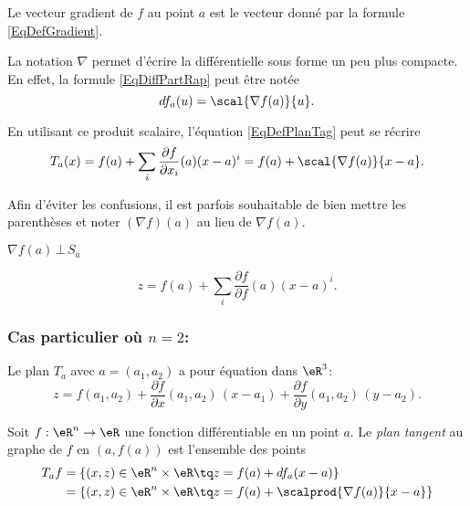 \begin{definition}
	Le vecteur gradient de $f$ au point $a$ est le vecteur donné par la formule \eqref{EqDefGradient}.
\end{definition}
La notation $\nabla$ permet d'écrire la différentielle sous forme un peu plus compacte. En effet, la formule \eqref{EqDiffPartRap} peut être notée
\begin{equation}
	df_a(u)=\scal{\nabla f(a)}{u}.
\end{equation}

En utilisant ce produit scalaire, l'équation \eqref{EqDefPlanTag} peut se récrire
\begin{equation}
	T_a(x)=f(a)+\sum_i\frac{ \partial f }{ \partial x_i }(a)(x-a)^i=f(a)+\scal{\nabla f(a)}{x-a}.
\end{equation}

Afin d'éviter les confusions, il est parfois souhaitable de bien mettre les parenthèses et noter $(\nabla f)(a)$ au lieu de $\nabla f(a)$.

\begin{proposition}
	$\nabla f(a)\,\bot \,S_a$
\end{proposition}


\begin{equation}        \label{EqPlanTgSansNabla}
	z=f(a)+\sum_i\frac{ \partial f }{ \partial f }(a)(x-a)^i.
\end{equation}

\subsubsection*{Cas particulier où $n=2$:}
Le plan $T_a$ avec $a=(a_1,a_2)$ a pour équation dans $\eR^3$:
\begin{equation}        \label{EqPlanTgEnDimDeux}
	z = f(a_1,a_2) + \frac{\partial f}{\partial x}(a_1,a_2)\,(x-a_1)+ \frac{\partial f}{\partial y}(a_1,a_2)\,(y-a_2).
\end{equation}

\begin{definition}
	Soit $f : \eR^n \to\eR$ une fonction différentiable en un point
	$a$. Le \emph{plan tangent} au graphe de $f$ en $(a,f(a))$ est
	l'ensemble des points
	\begin{equation*}
		\begin{split}
			T_af &= \{ (x,z) \in \eR^n \times \eR \tq z = f(a) + d f_a (x-a)\}\\
			&= \{ (x,z) \in \eR^n \times \eR \tq z = f(a) + \scalprod{\nabla f(a)}{x-a}\}
		\end{split}
	\end{equation*}
\end{definition}


